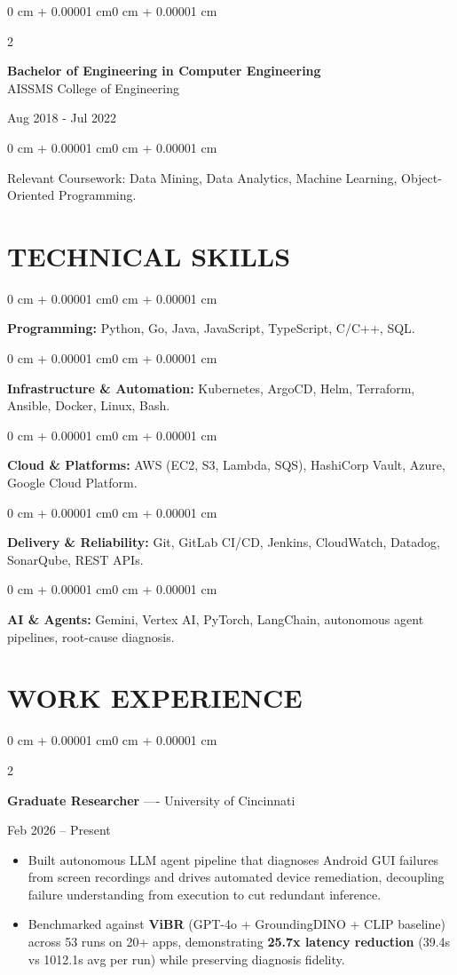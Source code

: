\documentclass[10pt, letterpaper]{article}
\newenvironment{highlights}{
    \begin{itemize}[
        topsep=0.10 cm,
        parsep=0.06 cm,
        partopsep=0pt,
        itemsep=0.06 cm,
        leftmargin=12pt
    ]
}{
    \end{itemize}
}
\newenvironment{onecolentry}{
    \begin{adjustwidth}{0 cm + 0.00001 cm}{0 cm + 0.00001 cm}
}{
    \end{adjustwidth}
}
\newenvironment{twocolentry}[2][]{
    \onecolentry
    \def\secondColumn{#2}
    \setcolumnwidth{\fill, 4.5 cm}
    \begin{paracol}{2}
}{
    \switchcolumn \raggedleft \secondColumn
    \end{paracol}
    \endonecolentry
}
\begin{document}
\begin{twocolentry}{
    Aug 2018 - Jul 2022
}
    \textbf{Bachelor of Engineering in Computer Engineering} \\
    AISSMS College of Engineering
\end{twocolentry}
\begin{onecolentry}
Relevant Coursework: Data Mining, Data Analytics, Machine Learning, Object-Oriented Programming.
\end{onecolentry}
\section{TECHNICAL SKILLS}
\begin{onecolentry}
\textbf{Programming:} Python, Go, Java, JavaScript, TypeScript, C/C++, SQL.
\end{onecolentry}
\vspace{0.06 cm}
\begin{onecolentry}
\textbf{Infrastructure \& Automation:} Kubernetes, ArgoCD, Helm, Terraform, Ansible, Docker, Linux, Bash.
\end{onecolentry}
\vspace{0.06 cm}
\begin{onecolentry}
\textbf{Cloud \& Platforms:} AWS (EC2, S3, Lambda, SQS), HashiCorp Vault, Azure, Google Cloud Platform.
\end{onecolentry}
\vspace{0.06 cm}
\begin{onecolentry}
\textbf{Delivery \& Reliability:} Git, GitLab CI/CD, Jenkins, CloudWatch, Datadog, SonarQube, REST APIs.
\end{onecolentry}
\vspace{0.06 cm}
\begin{onecolentry}
\textbf{AI \& Agents:} Gemini, Vertex AI, PyTorch, LangChain, autonomous agent pipelines, root-cause diagnosis.
\end{onecolentry}

\section{WORK EXPERIENCE}
\begin{twocolentry}{Feb 2026 -- Present}
\textbf{Graduate Researcher} ---- University of Cincinnati
\end{twocolentry}
\begin{highlights}
  \item Built autonomous LLM agent pipeline that diagnoses Android GUI failures from screen recordings and drives automated device remediation, decoupling failure understanding from execution to cut redundant inference.
  \item Benchmarked against \textbf{ViBR} (GPT-4o + GroundingDINO + CLIP baseline) across 53 runs on 20+ apps, demonstrating \textbf{25.7x latency reduction} (39.4s vs 1012.1s avg per run) while preserving diagnosis fidelity.
\end{highlights}
\end{document}
